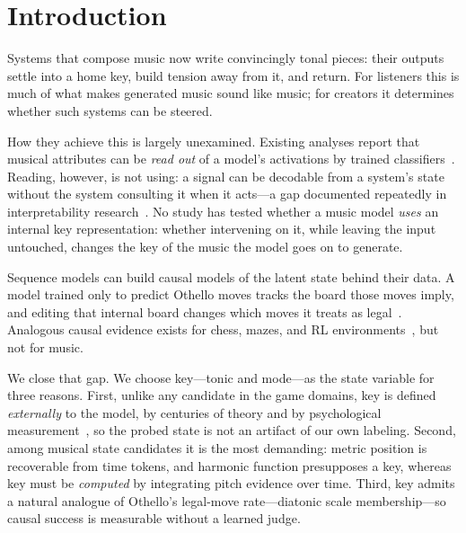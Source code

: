 \documentclass[conference]{IEEEtran}
\begin{document}
\section{Introduction}
\label{sec:intro}
Systems that compose music now write convincingly tonal pieces: their outputs
settle into a home key, build tension away from it, and return. For listeners
this is much of what makes generated music sound like music; for creators it
determines whether such systems can be steered.

How they achieve this is largely unexamined. Existing analyses report that
musical attributes can be \emph{read out} of a model's activations by trained
classifiers~\cite{syntheory2024}. Reading, however, is not using: a signal can be
decodable from a system's state without the system consulting it when it
acts---a gap documented repeatedly in interpretability
research~\cite{hewitt2019control}. No study has tested whether a music model
\emph{uses} an internal key representation: whether intervening on it, while
leaving the input untouched, changes the key of the music the model goes on to
generate.

Sequence models can build causal models of the latent state behind their data. A
model trained only to predict Othello moves tracks the board those moves imply,
and editing that internal board changes which moves it treats as
legal~\cite{li2023othello,nanda2023emergent}. Analogous causal evidence exists
for chess, mazes, and RL environments~\cite{karvonen2024chess,maze2024,iris2026},
but not for music.

We close that gap. We choose key---tonic and mode---as the state variable for
three reasons. First, unlike any candidate in the game domains, key is defined
\emph{externally} to the model, by centuries of theory and by psychological
measurement~\cite{krumhansl1982}, so the probed state is not an artifact of our
own labeling. Second, among musical state candidates it is the most demanding:
metric position is recoverable from time tokens, and harmonic function
presupposes a key, whereas key must be \emph{computed} by integrating pitch
evidence over time. Third, key admits a natural analogue of Othello's legal-move
rate---diatonic scale membership---so causal success is measurable without a
learned judge.
\end{document}
